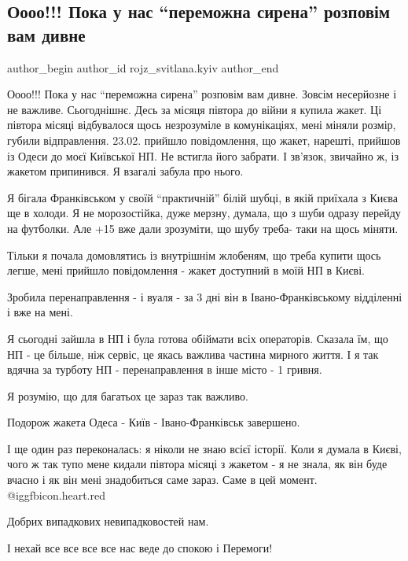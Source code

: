  
 
 
 
 
 
\subsection{Оооо!!! Пока у нас \enquote{переможна сирена} розповім вам дивне}
\label{sec:29_03_2022.fb.rojz_svitlana.kyiv.1.sirena}
 
\ifcmt
 author_begin
   author_id rojz_svitlana.kyiv
 author_end
\fi

Оооо!!! Пока у нас \enquote{переможна сирена} розповім вам дивне. Зовсім
несерйозне і не важливе. Сьогоднішнє. Десь за місяця півтора до
війни я купила жакет. Ці півтора місяці відбувалося щось
незрозуміле в комунікаціях, мені міняли розмір, губили
відправлення. 23.02. прийшло повідомлення, що жакет, нарешті,
прийшов із Одеси до моєї Київської НП. Не встигла його забрати. І
зв'язок, звичайно ж, із жакетом припинився. Я взагалі забула про
нього.

Я бігала Франківськом у своїй \enquote{практичній} білій шубці, в якій приїхала з Києва
ще в холоди. Я не морозостійка, дуже мерзну, думала, що з шуби одразу перейду
на футболки. Але +15 вже дали зрозуміти, що шубу треба- таки на щось міняти.

Тільки я почала домовлятись із внутрішнім жлобеням, що треба купити щось легше,
мені прийшло повідомлення - жакет доступний в моїй НП в Києві.

Зробила перенаправлення - і вуаля - за 3 дні він в Івано-Франківському
відділенні і вже на мені.

Я сьогодні зайшла в НП і була готова обіймати всіх операторів. Сказала їм, що
НП - це більше, ніж сервіс, це якась важлива частина мирного життя. І я так
вдячна за турботу НП - перенаправлення в інше місто - 1 гривня.

Я розумію, що для багатьох це зараз так важливо.

Подорож жакета Одеса - Київ - Івано-Франківськ завершено.

І ще один раз переконалась: я ніколи не знаю всієї історії. Коли я думала в
Києві, чого ж так тупо мене кидали півтора місяці з жакетом - я не знала, як
він буде вчасно і як він мені знадобиться саме зараз. Саме в цей момент. @igg{fbicon.heart.red}

Добрих випадкових невипадковостей нам.

І нехай все все все все нас веде до спокою і Перемоги!

